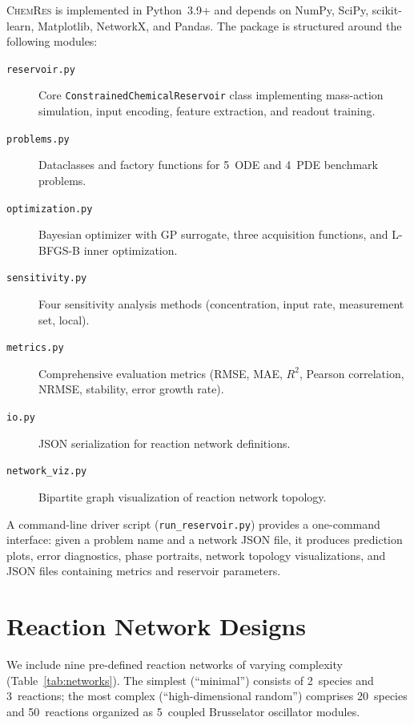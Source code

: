\documentclass[11pt,twocolumn]{article}
\newcommand{\software}{\textsc{ChemRes}}
\begin{document}
\software{} is implemented in Python~3.9+ and depends on NumPy, SciPy,
scikit-learn, Matplotlib, NetworkX, and Pandas.  The package is structured
around the following modules:

\begin{description}
  \item[\texttt{reservoir.py}] Core \texttt{ConstrainedChemicalReservoir}
    class implementing mass-action simulation, input encoding, feature
    extraction, and readout training.
  \item[\texttt{problems.py}] Dataclasses and factory functions for 5~ODE and
    4~PDE benchmark problems.
  \item[\texttt{optimization.py}] Bayesian optimizer with GP surrogate,
    three acquisition functions, and L-BFGS-B inner optimization.
  \item[\texttt{sensitivity.py}] Four sensitivity analysis methods
    (concentration, input rate, measurement set, local).
  \item[\texttt{metrics.py}] Comprehensive evaluation metrics (RMSE, MAE,
    $R^2$, Pearson correlation, NRMSE, stability, error growth rate).
  \item[\texttt{io.py}] JSON serialization for reaction network definitions.
  \item[\texttt{network\_viz.py}] Bipartite graph visualization of reaction
    network topology.
\end{description}

A command-line driver script (\texttt{run\_reservoir.py}) provides a
one-command interface: given a problem name and a network JSON file, it
produces prediction plots, error diagnostics, phase portraits, network
topology visualizations, and JSON files containing metrics and reservoir
parameters.

\section{Reaction Network Designs}
\label{sec:networks}

We include nine pre-defined reaction networks of varying complexity
(Table~\ref{tab:networks}).  The simplest (``minimal'') consists of 2~species
and 3~reactions; the most complex (``high-dimensional random'') comprises
20~species and 50~reactions organized as 5~coupled Brusselator oscillator
modules.
\end{document}
